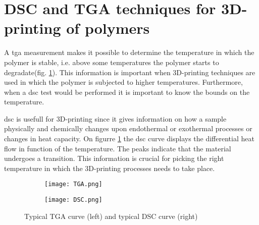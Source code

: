 \section{DSC and TGA techniques for 3D-printing of polymers}

A \gls{tga} measurement makes it possible to determine the temperature in which the polymer is stable, i.e. above some temperatures the polymer starts to degradate(fig. \ref{fig:TGA_DSC}). 
This information is important when 3D-printing techniques are used in which the polymer is subjected to higher temperatures. Furthermore, when a \gls{dsc} test would be performed it is important 
to know the bounds on the temperature. 

\gls{dsc} is usefull for 3D-printing since it gives information on how a sample physically and chemically changes upon endothermal or exothermal processes or changes in heat capacity. On figurre \ref{fig:TGA_DSC} the \gls{dsc} curve displays the differential heat flow in function of the temperature. 
The peaks indicate that the material undergoes a transition. This information is crucial for picking the right temperature in which the 3D-printing processes needs to take place.

\begin{figure}[ht]
    \centering
    \begin{subfigure}[b]{0.4\textwidth}
        \texttt{[image: TGA.png]}
    \end{subfigure}
    \begin{subfigure} [b]{0.5\textwidth}
        \texttt{[image: DSC.png]}
    \end{subfigure}
    \caption{Typical TGA curve (left) and typical DSC curve (right)}
    \label{fig:TGA_DSC}
\end{figure}